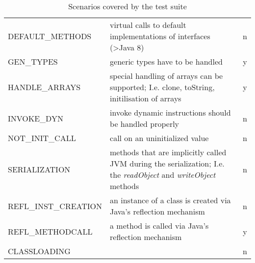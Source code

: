 \begin{table}[htpb]
\begin{tabularx}{\textwidth}{ l X c}
		DEFAULT\_METHODS                            & virtual calls to default implementations of interfaces (\textgreater Java 8)                                                                                         & n                 \\
		\rowcolor{light-gray}
		GEN\_TYPES          & generic types have to be handled                                                                                                                                     & y                 \\
		HANDLE\_ARRAYS                              & special handling of arrays can be supported; I.e. clone, toString, initilisation of arrays                                                                           & y                 \\
		\rowcolor{light-gray}
		INVOKE\_DYN         & invoke dynamic instructions should be handled properly                                                                                                               & n                 \\
		NOT\_INIT\_CALL                             & call on an uninitialized value                                                                                                                                       & n                 \\
		\rowcolor{light-gray}
		SERIALIZATION       & methods that are implicitly called JVM during the serialization; I.e. the \emph{readObject} and \emph{writeObject} methods                                           & n                 \\
		REFL\_INST\_CREATION                        & an instance of a class is created via Java's reflection mechanism                                                                                                    & n                 \\
		\rowcolor{light-gray}
		REFL\_METHODCALL    & a method is called via Java's reflection 
		mechanism                                                                                                                & y                 \\
		CLASSLOADING                                &                                                                                                                                                                      & n
	\end{tabularx}
	\centering
	\caption{Scenarios covered by the test suite}
	\label{table:results_casestudy}
\end{table}
